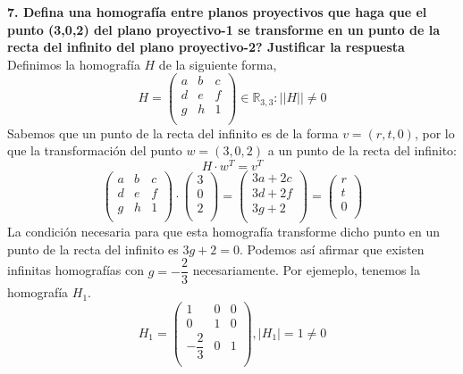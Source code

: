 \documentclass[12pt,a4paper]{article}
\begin{document}
	\newpage
	\textbf{7. Defina una homografía entre planos proyectivos que haga que el punto (3,0,2) del plano proyectivo-1 se transforme en un punto de la recta del infinito del plano proyectivo-2? Justificar la respuesta}
	\newline\newline
	Definimos la homografía $H$ de la siguiente forma,
	$$H = 
	\begin{pmatrix}
	a & b & c\\
	d & e & f\\
	g & h & 1\\
	\end{pmatrix} \in \mathbb{R}_{3,3} : \vert\vert H\vert\vert\neq 0
	$$
	Sabemos que un punto de la recta del infinito es de la forma $v=(r, t, 0)$, por lo que la transformación del punto $w=(3, 0, 2)$ a un punto de la recta del infinito:
	$$ H \cdot w^T = v^T  $$
	$$ \begin{pmatrix}
	a & b & c\\
	d & e & f\\
	g & h & 1\\
	\end{pmatrix} \cdot
	\begin{pmatrix}
	3\\
	0\\
	2\\
	\end{pmatrix} = \begin{pmatrix}
	3a+2c\\
	3d+2f\\
	3g+2\\
	\end{pmatrix}=
	\begin{pmatrix}
	r\\
	t\\
	0\\
	\end{pmatrix} $$
	La condición necesaria para que esta homografía transforme dicho punto en un punto de la recta del infinito es $3g+2=0$. Podemos así afirmar que existen infinitas homografías con $g=-\dfrac{2}{3}$ necesariamente.\newline
	Por ejemeplo, tenemos la homografía $H_1$.
	$$H_1 = \begin{pmatrix}
	1 & 0 & 0\\
	0 & 1 & 0\\
	-\dfrac{2}{3} & 0 & 1\\
	\end{pmatrix}, \vert H_1\vert = 1\neq 0$$ 
	
\end{document}
